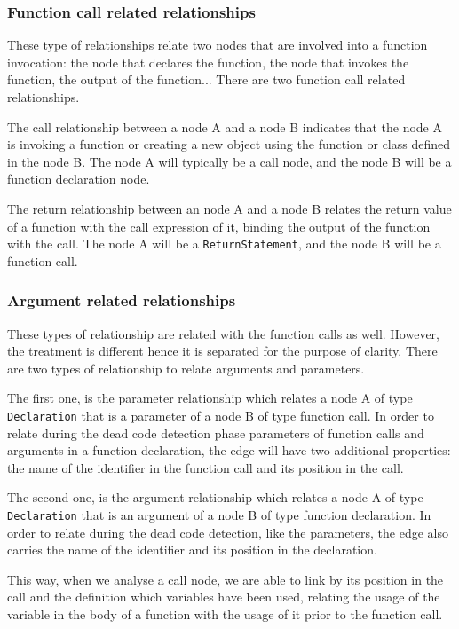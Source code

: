 \documentclass{uvamscse}
\begin{document}
\subsubsection{Function call related relationships}
These type of relationships relate two nodes that are involved into a function invocation: the node that declares the function, the node that invokes the function, the output of the function... There are two function call related relationships. 

The call relationship between a node A and a node B indicates that the node A is invoking a function or creating a new object using the function or class defined in the node B. The node A will typically be a call node, and the node B will be a function declaration node.

The return relationship between an node A and a node B relates the return value of a function with the call expression of it, binding the output of the function with the call. The node A will be a \texttt{ReturnStatement}, and the node B will be a function call.

\subsubsection{Argument related relationships}
These types of relationship are related with the function calls as well. However, the treatment is different hence it is separated for the purpose of clarity. There are two types of relationship to relate arguments and parameters. 

The first one, is the parameter relationship which relates a node A of type \texttt{Declaration} that is a parameter of a node B of type function call. In order to relate during the dead code detection phase parameters of function calls and arguments in a function declaration, the edge will have two additional properties: the name of the identifier in the function call and its position in the call.

The second one, is the argument relationship which relates a node A of type \texttt{Declaration} that is an argument of a node B of type function declaration. In order to relate during the dead code detection, like the parameters, the edge also carries the name of the identifier and its position in the declaration.

This way, when we analyse a call node, we are able to link by its position in the call and the definition which variables have been used, relating the usage of the variable in the body of a function with the usage of it prior to the function call.
\end{document}
